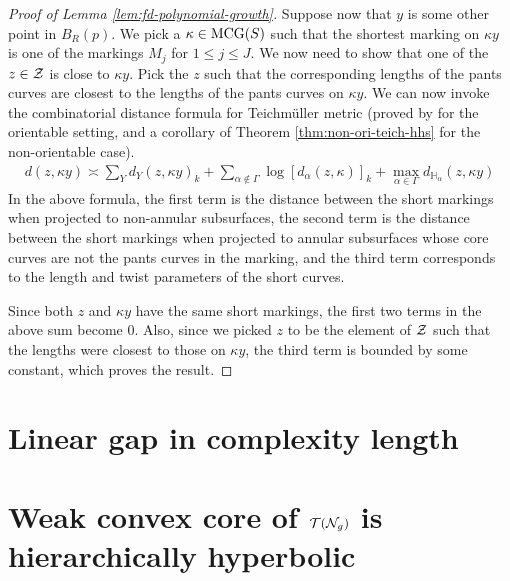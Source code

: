 \documentclass[12pt, reqno]{amsart}
\begin{document}
\begin{proof}[Proof of Lemma \ref{lem:fd-polynomial-growth}]
  Suppose now that $y$ is some other point in $B_R(p)$.
  We pick a $\kappa \in \mathrm{MCG}(S)$ such that the shortest marking on $\kappa y$ is one of the markings $M_j$ for $1 \leq j \leq J$.
  We now need to show that one of the $z \in \mathcal{Z}$ is close to $\kappa y$.
  Pick the $z$ such that the corresponding lengths of the pants curves are closest to the lengths of the pants curves on $\kappa y$.
  We can now invoke the combinatorial distance formula for Teichmüller metric (proved by \textcite{rafi2007combinatorial} for the orientable setting, and a corollary of Theorem \ref{thm:non-ori-teich-hhs} for the non-orientable case).
  \begin{align*}
    d(z, \kappa y) \asymp \sum_Y d_Y(z, \kappa y)_k + \sum_{\alpha \not \in \Gamma} \log \left[ d_{\alpha} (z, \kappa) \right]_k + \max_{\alpha \in \Gamma} d_{\mathbb{H}_{\alpha}} (z, \kappa y)
  \end{align*}
  In the above formula, the first term is the distance between the short markings when projected to non-annular subsurfaces, the second term is the distance between the short markings when projected to annular subsurfaces whose core curves are not the pants curves in the marking, and the third term corresponds to the length and twist parameters of the short curves.

  Since both $z$ and $\kappa y$ have the same short markings, the first two terms in the above sum become $0$.
  Also, since we picked $z$ to be the element of $\mathcal{Z}$ such that the lengths were closest to those on $\kappa y$, the third term is bounded by some constant, which proves the result.
\end{proof}

\section{Linear gap in complexity length}
\label{sec:line-gap-compl}



\appendix

\section{Weak convex core of $\mathcal{T}(\mathcal{N}_g)$ is hierarchically hyperbolic}
\label{sec:trunc-teichm-space}

\printbibliography
\end{document}

